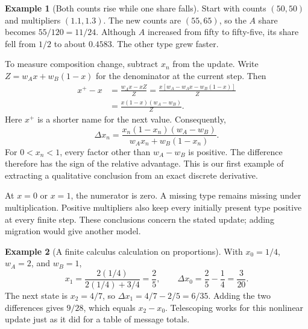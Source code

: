 \documentclass[11pt,oneside,openany]{book}
\theoremstyle{definition}
\newtheorem{example}{Example}[chapter]
\theoremstyle{remark}
\numberwithin{equation}{chapter}
\begin{document}
\begin{example}[Both counts rise while one share falls]

Start with counts \((50,50)\) and multipliers \((1.1,1.3)\). The new counts are \((55,65)\), so the \(A\) share becomes \(55/120=11/24\). Although \(A\) increased from fifty to fifty-five, its share fell from \(1/2\) to about \(0.4583\). The other type grew faster.

\end{example}

To measure composition change, subtract \(x_n\) from the update. Write \(Z=w_Ax+w_B(1-x)\) for the denominator at the current step. Then \[\begin{aligned}
x^+-x&=\frac{w_Ax-xZ}{Z}
=\frac{x[w_A-w_Ax-w_B(1-x)]}{Z}\\
&=\frac{x(1-x)(w_A-w_B)}{Z}.
\end{aligned}\] Here \(x^+\) is a shorter name for the next value. Consequently, \[\boxed{\Delta x_n=\frac{x_n(1-x_n)(w_A-w_B)}{w_Ax_n+w_B(1-x_n)}.}\] For \(0<x_n<1\), every factor other than \(w_A-w_B\) is positive. The difference therefore has the sign of the relative advantage. This is our first example of extracting a qualitative conclusion from an exact discrete derivative.

At \(x=0\) or \(x=1\), the numerator is zero. A missing type remains missing under multiplication. Positive multipliers also keep every initially present type positive at every finite step. These conclusions concern the stated update; adding migration would give another model.

\begin{example}[A finite calculus calculation on proportions]

With \(x_0=1/4\), \(w_A=2\), and \(w_B=1\), \[x_1=\frac{2(1/4)}{2(1/4)+3/4}=\frac25,\qquad
\Delta x_0=\frac25-\frac14=\frac3{20}.\] The next state is \(x_2=4/7\), so \(\Delta x_1=4/7-2/5=6/35\). Adding the two differences gives \(9/28\), which equals \(x_2-x_0\). Telescoping works for this nonlinear update just as it did for a table of message totals.

\end{example}
\end{document}
